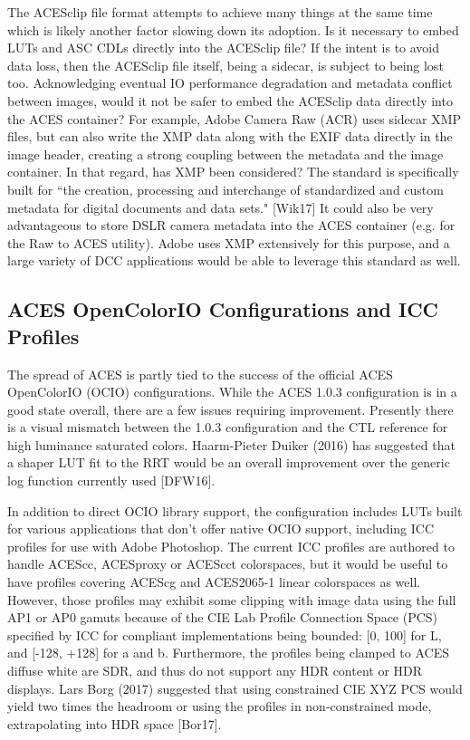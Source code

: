 \documentclass[conference]{IEEEtran}
\begin{document}
The ACESclip file format attempts to achieve many things at the same time which is likely another factor slowing down its adoption. Is it necessary to embed LUTs and ASC CDLs directly into the ACESclip file? If the intent is to avoid data loss, then the ACESclip file itself, being a sidecar, is subject to being lost too. Acknowledging eventual IO performance degradation and metadata conflict between images, would it not be safer to embed the ACESclip data directly into the ACES container? For example, Adobe Camera Raw (ACR) uses sidecar XMP files, but can also write the XMP data along with the EXIF data directly in the image header, creating a strong coupling between the metadata and the image container. In that regard, has XMP been considered? The standard is specifically built for ``the creation, processing and interchange of standardized and custom metadata for digital documents and data sets." [Wik17] It could also be very advantageous to store DSLR camera metadata into the ACES container (e.g. for the Raw to ACES utility). Adobe uses XMP extensively for this purpose, and a large variety of DCC applications would be able to leverage this standard as well.

\subsection{ACES OpenColorIO Configurations and ICC Profiles}
The spread of ACES is partly tied to the success of the official ACES OpenColorIO (OCIO) configurations. While the ACES 1.0.3 configuration is in a good state overall, there are a few issues requiring improvement. Presently there is a visual mismatch between the 1.0.3 configuration and the CTL reference for high luminance saturated colors. Haarm-Pieter Duiker (2016) has suggested that a shaper LUT fit to the RRT would be an overall improvement over the generic log function currently used [DFW16].

In addition to direct OCIO library support, the configuration includes LUTs built for various applications that don’t offer native OCIO support, including ICC profiles for use with Adobe Photoshop. The current ICC profiles are authored to handle ACEScc, ACESproxy or ACEScct colorspaces, but it would be useful to have profiles covering ACEScg and ACES2065-1 linear colorspaces as well. However, those profiles may exhibit some clipping with image data using the full AP1 or AP0 gamuts because of the CIE Lab Profile Connection Space (PCS) specified by ICC for compliant implementations being bounded: [0, 100] for L, and [-128, +128] for a and b. Furthermore, the profiles being clamped to ACES diffuse white are SDR, and thus do not support any HDR content or HDR displays. Lars Borg (2017) suggested that using constrained CIE XYZ PCS would yield two times the headroom or using the profiles in non-constrained mode, extrapolating into HDR space [Bor17].
\end{document}

